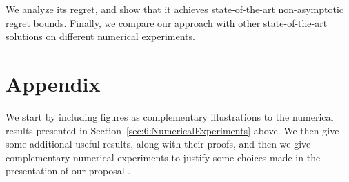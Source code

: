 %
We analyze its regret, and show that it achieves state-of-the-art non-asymptotic regret bounds.
%
Finally, we compare our approach with other state-of-the-art solutions on different numerical experiments.

\minitocStartChapter{}









\newpage
\section{Appendix}
\label{sec:6:appendix}

We start by including figures as complementary illustrations to the numerical results presented in Section~\ref{sec:6:NumericalExperiments} above.
We then give some additional useful results, along with their proofs, and then we give complementary numerical experiments to justify some choices made in the presentation of our proposal \GLRklUCB.



